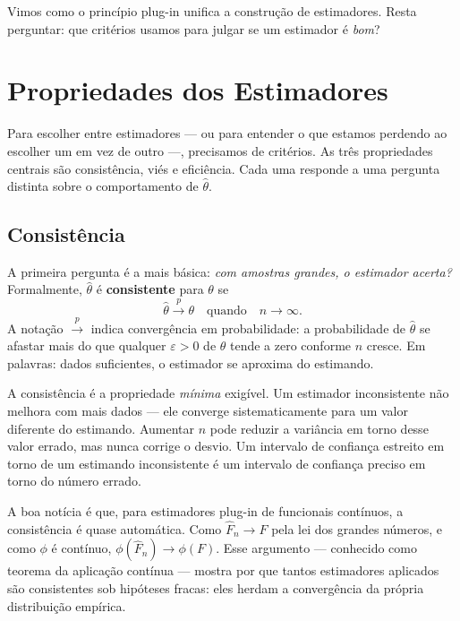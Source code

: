 Vimos como o princípio plug-in unifica a construção de estimadores. Resta perguntar: que critérios usamos para julgar se um estimador é \textit{bom}?


\section{Propriedades dos Estimadores}
\label{subsec:propriedades}

Para escolher entre estimadores --- ou para entender o que estamos perdendo ao escolher um em vez de outro ---, precisamos de critérios. As três propriedades centrais são consistência, viés e eficiência. Cada uma responde a uma pergunta distinta sobre o comportamento de $\hat{\theta}$.

\subsection*{Consistência}

A primeira pergunta é a mais básica: \textit{com amostras grandes, o estimador acerta?} Formalmente, $\hat{\theta}$ é \textbf{consistente} para $\theta$ se
\begin{equation}
\hat{\theta} \xrightarrow{p} \theta \quad \text{quando} \quad n \to \infty.
\label{eq:consistencia}
\end{equation}
A notação $\xrightarrow{p}$ indica convergência em probabilidade: a probabilidade de $\hat{\theta}$ se afastar mais do que qualquer $\varepsilon > 0$ de $\theta$ tende a zero conforme $n$ cresce. Em palavras: dados suficientes, o estimador se aproxima do estimando.

A consistência é a propriedade \textit{mínima} exigível. Um estimador inconsistente não melhora com mais dados --- ele converge sistematicamente para um valor diferente do estimando. Aumentar $n$ pode reduzir a variância em torno desse valor errado, mas nunca corrige o desvio. Um intervalo de confiança estreito em torno de um estimando inconsistente é um intervalo de confiança preciso em torno do número errado.

A boa notícia é que, para estimadores plug-in de funcionais contínuos, a consistência é quase automática. Como $\hat{F}_n \to F$ pela lei dos grandes números, e como $\phi$ é contínuo, $\phi(\hat{F}_n) \to \phi(F)$. Esse argumento --- conhecido como teorema da aplicação contínua --- mostra por que tantos estimadores aplicados são consistentes sob hipóteses fracas: eles herdam a convergência da própria distribuição empírica.

